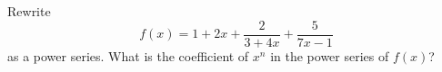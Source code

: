 Rewrite 
\[
f(x) = 1 + 2x + \frac{2}{3 + 4x} + \frac{5}{7x - 1}
\]
as a power series.
What is the coefficient of $x^n$ in the power series of $f(x)$?
